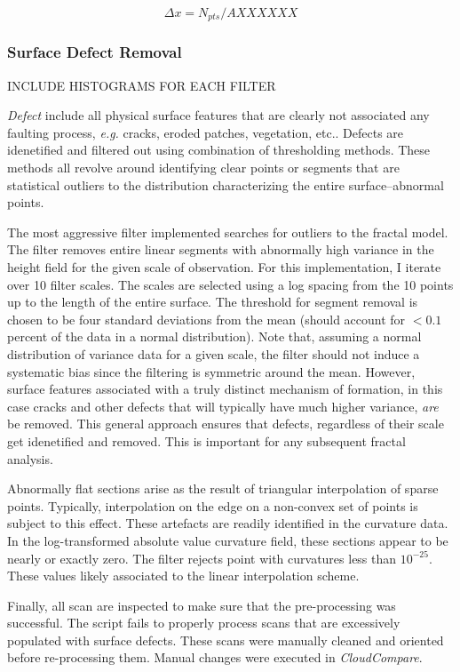 \documentclass[12pt,a4paper]{article}
\begin{document}
\begin{equation}
	\Delta x = N_{pts}/A XXXXXX
\end{equation}

		\subsubsection{Surface Defect Removal} 

INCLUDE HISTOGRAMS FOR EACH FILTER


\textit{Defect} include all physical surface features that are clearly not associated any faulting process, \textit{e.g.} cracks, eroded patches, vegetation, etc.. Defects are idenetified and filtered out using combination of thresholding methods. These methods all revolve around identifying clear points or segments that are statistical outliers to the distribution characterizing the entire surface--abnormal points. 

The most aggressive filter implemented searches for outliers to the fractal model. The filter removes entire linear segments with abnormally high variance in the height field for the given scale of observation. For this implementation, I iterate over 10 filter scales. The scales are selected using a log spacing from the 10 points up to the length of the entire surface. The threshold for segment removal is chosen to be four standard deviations from the mean (should account for $<0.1$ percent of the data in a normal distribution). Note that, assuming a normal distribution of variance data for a given scale, the filter should not induce a systematic bias since the filtering is symmetric around the mean. However, surface features associated with a truly distinct mechanism of formation, in this case cracks and other defects that will typically have much higher variance, \textit{are} be removed. This general approach ensures that defects, regardless of their scale get idenetified and removed. This is important for any subsequent fractal analysis.

Abnormally flat sections arise as the result of triangular interpolation of sparse points. Typically, interpolation on the edge on a non-convex set of points is subject to this effect. These artefacts are readily identified in the curvature data. In the log-transformed absolute value curvature field, these sections appear to be nearly or exactly zero. The filter rejects point with curvatures less than $10^{-25}$. These values likely associated to the linear interpolation scheme.

Finally, all scan are inspected to make sure that the pre-processing was successful. The script fails to properly process scans that are excessively populated with surface defects. These scans were manually cleaned and oriented before re-processing them. Manual changes were executed in \textit{CloudCompare}. 
\end{document}
